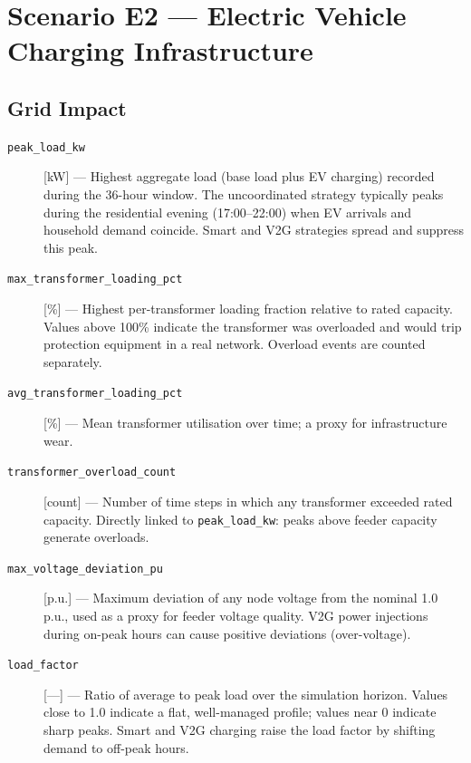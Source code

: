 \section{Scenario E2 --- Electric Vehicle Charging Infrastructure}
\label{sec:metrics-e2}

\subsection*{Grid Impact}

\begin{description}

\item[\texttt{peak\_load\_kw}] [kW] ---
  Highest aggregate load (base load plus EV charging) recorded during the
  36-hour window.  The uncoordinated strategy typically peaks during the
  residential evening (17:00--22:00) when EV arrivals and household demand
  coincide.  Smart and V2G strategies spread and suppress this peak.

\item[\texttt{max\_transformer\_loading\_pct}] [\%] ---
  Highest per-transformer loading fraction relative to rated capacity.  Values
  above 100\% indicate the transformer was overloaded and would trip protection
  equipment in a real network.  Overload events are counted separately.

\item[\texttt{avg\_transformer\_loading\_pct}] [\%] ---
  Mean transformer utilisation over time; a proxy for infrastructure wear.

\item[\texttt{transformer\_overload\_count}] [count] ---
  Number of time steps in which any transformer exceeded rated capacity.
  Directly linked to \texttt{peak\_load\_kw}: peaks above feeder capacity
  generate overloads.

\item[\texttt{max\_voltage\_deviation\_pu}] [p.u.] ---
  Maximum deviation of any node voltage from the nominal 1.0\,p.u., used as a
  proxy for feeder voltage quality.  V2G power injections during on-peak hours
  can cause positive deviations (over-voltage).

\item[\texttt{load\_factor}] [---] ---
  Ratio of average to peak load over the simulation horizon.  Values close to
  1.0 indicate a flat, well-managed profile; values near 0 indicate sharp
  peaks.  Smart and V2G charging raise the load factor by shifting demand to
  off-peak hours.

\end{description}

